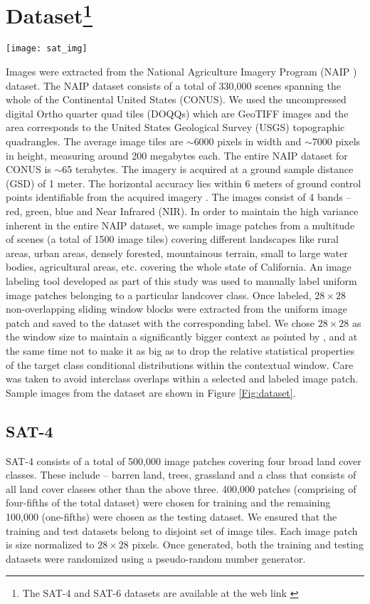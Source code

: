 \documentclass[11pt,a4paper]{article}
\begin{document}
\section[Dataset]{Dataset\footnote{The SAT-4 and SAT-6 datasets are available at the web link \cite{datasets}}}
\begin{figure*}
  \centering
    \texttt{[image: sat\_img]}
  \caption{Sample images from the SAT-6 dataset} \label{Fig:dataset}
\end{figure*}
Images were extracted from the National Agriculture Imagery Program (NAIP \cite{naip}) dataset. The NAIP dataset consists of a total of 330,000 scenes spanning the whole of the Continental United States (CONUS). We used the uncompressed digital Ortho quarter quad tiles (DOQQs) which are GeoTIFF images and the area corresponds to the United States Geological Survey (USGS) topographic quadrangles. The average image tiles are $\sim$6000 pixels in width and $\sim$7000 pixels in height, measuring around 200 megabytes each. The entire NAIP dataset for CONUS is $\sim$65 terabytes. The imagery is acquired at a ground sample distance (GSD) of 1 meter. The horizontal accuracy lies within 6 meters of ground control points identifiable from the acquired imagery \cite{modis}. The images consist of 4 bands -- red, green, blue and Near Infrared (NIR). In order to maintain the high variance inherent in the entire NAIP dataset, we sample image patches from a multitude of scenes (a total of 1500 image tiles) covering different landscapes like rural areas, urban areas, densely forested, mountainous terrain, small to large water bodies, agricultural areas, etc. covering the whole state of California. An image labeling tool developed as part of this study was used to manually label uniform image patches belonging to a particular landcover class. Once labeled, $28{\times}28$ non-overlapping sliding window blocks were extracted from the uniform image patch and saved to the dataset with the corresponding label. We chose $28{\times}28$ as the window size to maintain a significantly bigger context as pointed by \cite{MnihHinton2010}, and at the same time not to make it as big as to drop the relative statistical properties of the target class conditional distributions within the contextual window. Care was taken to avoid interclass overlaps within a selected and labeled image patch. Sample images from the dataset are shown in Figure \ref{Fig:dataset}.

\subsection{SAT-4}
SAT-4 consists of a total of 500,000 image patches covering four broad land cover classes. These include -- barren land, trees, grassland and a class that consists of all land cover classes other than the above three. 400,000 patches (comprising of four-fifths of the total dataset) were chosen for training and the remaining 100,000 (one-fifths) were chosen as the testing dataset. We ensured that the training and test datasets belong to disjoint set of image tiles. Each image patch is size normalized to $28{\times}28$ pixels. Once generated, both the training and testing datasets were randomized using a pseudo-random number generator.
\end{document}
